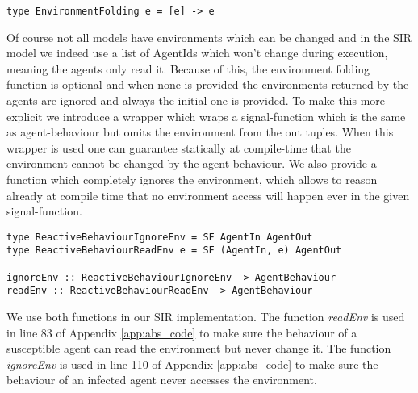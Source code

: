 \begin{verbatim}
type EnvironmentFolding e = [e] -> e
\end{verbatim}

Of course not all models have environments which can be changed and in the SIR model we indeed use a list of AgentIds which won't change during execution, meaning the agents only read it. Because of this, the environment folding function is optional and when none is provided the environments returned by the agents are ignored and always the initial one is provided.
To make this more explicit we introduce a wrapper which wraps a signal-function which is the same as agent-behaviour but omits the environment from the out tuples. When this wrapper is used one can guarantee statically at compile-time that the environment cannot be changed by the agent-behaviour. We also provide a function which completely ignores the environment, which allows to reason already at compile time that no environment access will happen ever in the given signal-function.

\begin{verbatim}
type ReactiveBehaviourIgnoreEnv = SF AgentIn AgentOut
type ReactiveBehaviourReadEnv e = SF (AgentIn, e) AgentOut

ignoreEnv :: ReactiveBehaviourIgnoreEnv -> AgentBehaviour
readEnv :: ReactiveBehaviourReadEnv -> AgentBehaviour
\end{verbatim}

We use both functions in our SIR implementation. The function \textit{readEnv} is used in line 83 of Appendix \ref{app:abs_code} to make sure the behaviour of a susceptible agent can read the environment but never change it. The function \textit{ignoreEnv} is used in line 110 of Appendix \ref{app:abs_code} to make sure the behaviour of an infected agent never accesses the environment.